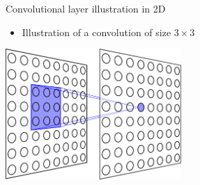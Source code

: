 \documentclass[xcolor=pdftex,dvipsnames,table,mathserif]{beamer}
\begin{document}
\begin{frame}{Convolutional layer illustration in 2D}


  \begin{itemize}
  \item Illustration of a convolution of size $3 \times 3$
  \end{itemize}

  \begin{center}
    \includegraphics[width=0.5\textwidth]{cnn_complet}
   \end{center}


\end{frame}
\end{document}

